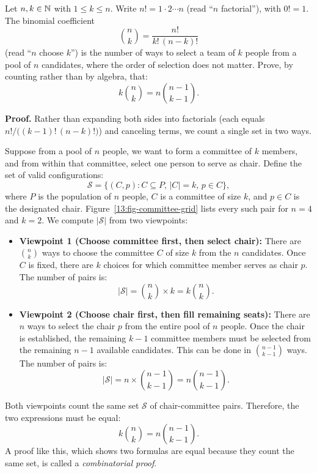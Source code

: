 \begin{example}
Let $n, k \in \mathbb{N}$ with $1 \le k \le n$. Write $n! = 1 \cdot 2 \cdots n$ (read ``$n$ factorial''), with $0! = 1$. The binomial coefficient
\[
\binom{n}{k} = \frac{n!}{k!\,(n-k)!}
\]
(read ``$n$ choose $k$'') is the number of ways to select a team of $k$ people from a pool of $n$ candidates, where the order of selection does not matter. Prove, by counting rather than by algebra, that:
\[
k \binom{n}{k} = n \binom{n-1}{k-1}.
\]

\textbf{Proof.}
Rather than expanding both sides into factorials (each equals $n!/\bigl((k-1)!\,(n-k)!\bigr)$) and canceling terms, we count a single set in two ways.

Suppose from a pool of $n$ people, we want to form a committee of $k$ members, and from within that committee, select one person to serve as chair. Define the set of valid configurations:
\[
\mathcal{S} = \{(C, p) : C \subseteq P, \, |C| = k, \, p \in C\},
\]
where $P$ is the population of $n$ people, $C$ is a committee of size $k$, and $p \in C$ is the designated chair. Figure~\ref{13:fig-committee-grid} lists every such pair for $n = 4$ and $k = 2$. We compute $|\mathcal{S}|$ from two viewpoints:
\begin{itemize}
\item \textbf{Viewpoint 1 (Choose committee first, then select chair):}
There are $\binom{n}{k}$ ways to choose the committee $C$ of size $k$ from the $n$ candidates. Once $C$ is fixed, there are $k$ choices for which committee member serves as chair $p$. The number of pairs is:
\[
|\mathcal{S}| = \binom{n}{k} \times k = k \binom{n}{k}.
\]
\item \textbf{Viewpoint 2 (Choose chair first, then fill remaining seats):}
There are $n$ ways to select the chair $p$ from the entire pool of $n$ people. Once the chair is established, the remaining $k-1$ committee members must be selected from the remaining $n-1$ available candidates. This can be done in $\binom{n-1}{k-1}$ ways. The number of pairs is:
\[
|\mathcal{S}| = n \times \binom{n-1}{k-1} = n \binom{n-1}{k-1}.
\]
\end{itemize}
Both viewpoints count the same set $\mathcal{S}$ of chair-committee pairs. Therefore, the two expressions must be equal:
\[
k \binom{n}{k} = n \binom{n-1}{k-1}.
\]
A proof like this, which shows two formulas are equal because they count the same set, is called a \emph{combinatorial proof}.
\end{example}

